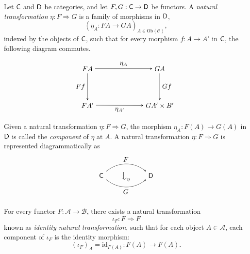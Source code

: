 \begin{definition}
  Let $\mathsf{C}$ and $\mathsf{D}$ be categories, and let $F, G : \mathsf{C} \to \mathsf{D}$ be functors. A \emph{natural transformation} $\eta : F \Rightarrow G$ is a family of morphisms in $\mathsf{D}$,
\[
\left( \eta_A : FA \to GA \right)_{A \in \mathrm{Ob}(\mathcal{C})},
\]
indexed by the objects of $\mathsf{C}$, such that for every morphism $f : A \to A'$ in $\mathsf{C}$, the following diagram commutes. 

\[
\begin{tikzpicture}
  \matrix (m) [matrix of math nodes,row sep=4em,column sep=7em,minimum width=2em]
  {
   FA  & GA  \\
    FA'  & GA' \times B'  \\
  };
  \path[-stealth]
    (m-1-1) edge  node [above] {$\eta_A$} (m-1-2)
    (m-2-1) edge  node [below] {$\eta_{A'}$} (m-2-2)
    (m-1-1) edge  node [left] {$Ff$} (m-2-1)
    (m-1-2) edge  node [right] {$Gf$} (m-2-2)
    ;
\end{tikzpicture}
\]
Given a natural transformation \(\eta : F \Rightarrow G\), the morphism \(\eta_A : F(A) \to G(A)\) in \(\mathsf{D}\) is called the \emph{component} of \(\eta\) at \(A\).
A natural transformation $\eta : F \Rightarrow G$ is represented diagrammatically as 
\[
\begin{tikzpicture}
  \matrix (m) [matrix of math nodes,row sep=0.4em,column sep=2em,minimum width=1em]
  {
   \catC   & \big\Downarrow_{\eta} & \catD \\
  };
  \path[-stealth]
    (m-1-1) edge [bend left=40] node [above] {$F$} (m-1-3)
    (m-1-1) edge [bend left=-40] node [below] {$G$} (m-1-3)
    ;
\end{tikzpicture}
\]

\end{definition}


\begin{example}
  For every functor $F : \mathcal{A} \to \mathcal{B}$, there exists a natural transformation
  \[
    \iota_F : F \Rightarrow F
  \]
  known as  \emph{identity natural transformation},  such that for each object $A \in \mathcal{A}$, each component of $\iota_F$ is the identity morphism:
  \[
    (\iota_F)_A = \mathrm{id}_{F(A)} : F(A) \to F(A).
    \] 
\end{example}

